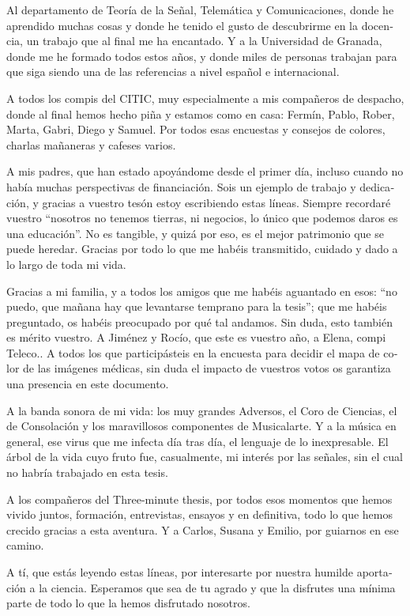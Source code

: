 \begin{otherlanguage}{spanish}
Al departamento de Teoría de la Señal, Telemática y Comunicaciones, donde he aprendido muchas cosas y donde he tenido el gusto de descubrirme en la docencia, un trabajo que al final me ha encantado. Y a la Universidad de Granada, donde me he formado todos estos años, y donde miles de personas trabajan para que siga siendo una de las referencias a nivel español e internacional. 

A todos los compis del CITIC, muy especialmente a mis compañeros de despacho, donde al final hemos hecho piña y estamos como en casa: Fermín, Pablo, Rober, Marta, Gabri, Diego y Samuel. Por todos esas encuestas y consejos de colores, charlas mañaneras y cafeses varios. 

A mis padres, que han estado apoyándome desde el primer día, incluso cuando no había muchas perspectivas de financiación. Sois un ejemplo de trabajo y dedicación, y gracias a vuestro tesón estoy escribiendo estas líneas. Siempre recordaré vuestro ``nosotros no tenemos tierras, ni negocios, lo único que podemos daros es una educación''. No es tangible, y quizá por eso, es el mejor patrimonio que se puede heredar. Gracias por todo lo que me habéis transmitido, cuidado y dado a lo largo de toda mi vida. 

Gracias a mi familia, y a todos los amigos que me habéis aguantado en esos: ``no puedo, que mañana hay que levantarse temprano para la tesis''; que me habéis preguntado, os habéis preocupado por qué tal andamos. Sin duda, esto también es mérito vuestro. A Jiménez y Rocío, que este es vuestro año, a Elena, compi Teleco.. A todos los que participásteis en la encuesta para decidir el mapa de color de las imágenes médicas, sin duda el impacto de vuestros votos os garantiza una presencia en este documento. 

A la banda sonora de mi vida: los muy grandes Adversos, el Coro de Ciencias, el de Consolación y los maravillosos componentes de Musicalarte. Y a la música en general, ese virus que me infecta día tras día, el lenguaje de lo inexpresable. El árbol de la vida cuyo fruto fue, casualmente, mi interés por las señales, sin el cual no habría trabajado en esta tesis. 

A los compañeros del Three-minute thesis, por todos esos momentos que hemos vivido juntos, formación, entrevistas, ensayos y en definitiva, todo lo que hemos crecido gracias a esta aventura. Y a Carlos, Susana y Emilio, por guiarnos en ese camino. 

A tí, que estás leyendo estas líneas, por interesarte por nuestra humilde aportación a la ciencia. Esperamos que sea de tu agrado y que la disfrutes una mínima parte de todo lo que la hemos disfrutado nosotros. 


\end{otherlanguage}

